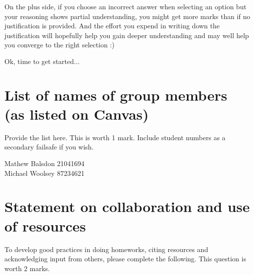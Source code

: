 \documentclass[11pt]{article}
\begin{document}
On the plus side, if you choose an incorrect answer when selecting an
option but your reasoning shows partial understanding, you might get
more marks than if no justification is provided. And the effort you
expend in writing down the justification will hopefully help you gain
deeper understanding and may well help you converge to the right
selection :)

Ok, time to get started...

\newpage
\vspace*{1pt}

\section{List of names of group members (as listed on Canvas)}

Provide the list here. This is worth 1 mark. Include student numbers
as a secondary failsafe if you wish.

\begin{soln}
Mathew Balsdon 21041694 \\
Michael Woolsey 87234621
\end{soln}

\section{Statement on collaboration and use of resources}
To develop good practices in doing homeworks,
citing resources and acknowledging input from others, please complete the following.
This question is worth 2 marks.
\end{document}
